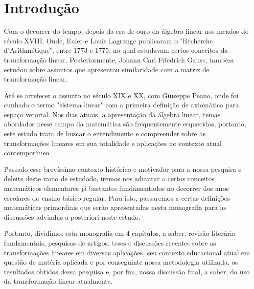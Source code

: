 \chapter{Introdução}
Com o decorrer do tempo, depois da era de ouro da álgebra linear nos meados do século XVIII. Onde, Euler e Louis Lagrange publicaram o "Recherche d'Arithmétique", entre 1773 e 1775, no qual estudavam certos conceitos da transformação linear. Posteriormente, Johann Carl Friedrich Gauss, também estudou sobre assuntos que apresentou similaridade com a matriz de transformação linear.

Até se arrefecer o assunto no século XIX e XX, com Giuseppe Peano, onde foi cunhado o termo "sistema linear" com a primeira definição de axiomática para espaço vetorial. Nos dias atuais, a apresentação da álgebra linear, temas abordados nesse campo da matemática são frequentemente esquecidos, portanto, este estudo trata de buscar o entendimento e compreender sobre as transformações lineares em sua totalidade e aplicações no contexto atual contemporâneo.

Passado esse brevíssimo contexto histórico e motivador para a nossa pesquisa e deleite deste ramo de estudado, iremos nos adiantar a certos conceitos matemáticos elementares já bastantes fundamentados no decorrer dos anos escolares do ensino básico regular. Para isto, passaremos a certas definições matemáticas primordiais que serão apresentadas nesta monografia para as discussões advindas a posteriori neste estudo.

Portanto, dividimos esta monografia em 4 capítulos, a saber, revisão literária fundamentais, pesquisas de artigos, teses e discussões recentes sobre as transformações lineares em diversas aplicações, seu contexto educacional atual em questão de matéria aplicada e por conseguinte nossa metodologia utilizada, os resultados obtidos dessa pesquisa e, por fim, nossa discussão final, a saber, do uso da transformação linear atualmente.